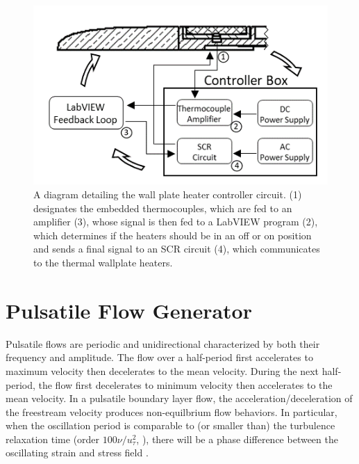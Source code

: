 \begin{figure}[h!]
\centering
\includegraphics[scale=1]{figures/facility/circuit_diagram_v2.png}
\caption{{\footnotesize A diagram detailing the wall plate heater controller circuit. (1) designates the embedded thermocouples, which are fed to an amplifier (3), whose signal is then fed to a LabVIEW program (2), which determines if the heaters should be in an off or on position and sends a final signal to an SCR circuit (4), which communicates to the thermal wallplate heaters.
}}
\label{fig:tempcontrol}
\end{figure}

\section{Pulsatile Flow Generator}
Pulsatile flows are periodic and unidirectional characterized by both their frequency and amplitude. 
The flow over a half-period first accelerates to maximum velocity then decelerates to the mean velocity. 
During the next half-period, the flow first decelerates to minimum velocity then accelerates to the mean velocity.
In a pulsatile boundary layer flow, the acceleration/deceleration of the freestream velocity  produces non-equilbrium flow behaviors. 
In particular, when the oscillation period is comparable to (or smaller than) the turbulence relaxation time (order $100 \nu / u_\tau^2$, \cite{Peters1993}), there will be a phase difference between the oscillating strain and stress field \cite{Weng2016}. 

